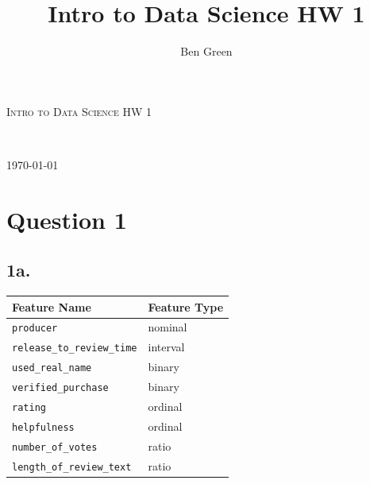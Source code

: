\documentclass{article}
\author{Ben Green}
\title{Intro to Data Science HW 1}
\begin{document}
\begin{titlepage}
	\begin{center}
	\textsc{\LARGE Intro to Data Science HW 1}\\
	\vspace{3mm}
	
	{\large \theauthor}\\
	
	\tableofcontents
	\setcounter{secnumdepth}{0}
	\vfill
	
	{\large \today}
	\end{center}

\end{titlepage}

\section{Question 1}

\subsection{1a.}
\begin{table}[h]
\begin{center}
\begin{tabular}{ll}
Feature Name                                    & Feature Type                  \\ \hline
\multicolumn{1}{|l|}{\texttt{producer}}                  & \multicolumn{1}{l|}{nominal}  \\ \hline
\multicolumn{1}{|l|}{\texttt{release\_to\_review\_time}} & \multicolumn{1}{l|}{interval} \\ \hline
\multicolumn{1}{|l|}{\texttt{used\_real\_name}}          & \multicolumn{1}{l|}{binary}   \\ \hline
\multicolumn{1}{|l|}{\texttt{verified\_purchase}}        & \multicolumn{1}{l|}{binary}   \\ \hline
\multicolumn{1}{|l|}{\texttt{rating}}                    & \multicolumn{1}{l|}{{ordinal}}  \\ \hline
\multicolumn{1}{|l|}{\texttt{helpfulness}}               & \multicolumn{1}{l|}{ordinal}  \\ \hline
\multicolumn{1}{|l|}{\texttt{number\_of\_votes}}         & \multicolumn{1}{l|}{ratio}    \\ \hline
\multicolumn{1}{|l|}{\texttt{length\_of\_review\_text}}  & \multicolumn{1}{l|}{ratio}    \\ \hline
\end{tabular}
\end{center}
\end{table}
\end{document}
